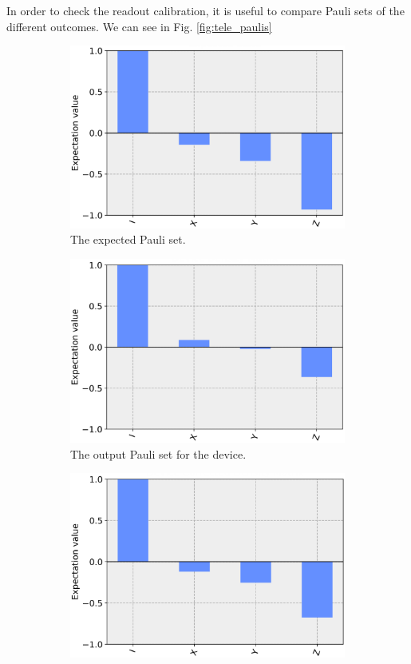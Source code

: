 In order to check the readout calibration, it is useful to compare Pauli sets of
the different outcomes. We can see in Fig. \ref{fig:tele_paulis}

\begin{figure}
  \begin{subfigure}{.5\textwidth} \centering %
\includegraphics[width=.8\linewidth]{images/results/tele_pauli_sim.png}
    \caption{The expected Pauli set.}
    \label{fig:tele_pauli_sim}
  \end{subfigure} \newline
  \begin{subfigure}{.5\textwidth} \centering %
\includegraphics[width=.8\linewidth]{images/results/tele_pauli_dev.png}
    \caption{The output Pauli set for the device.}
    \label{fig:tele_pauli_dev}
  \end{subfigure} \newline
  \begin{subfigure}{.5\textwidth} \centering %
\includegraphics[width=.8\linewidth]{images/results/tele_pauli_cal.png}

\end{subfigure}
\end{figure}
